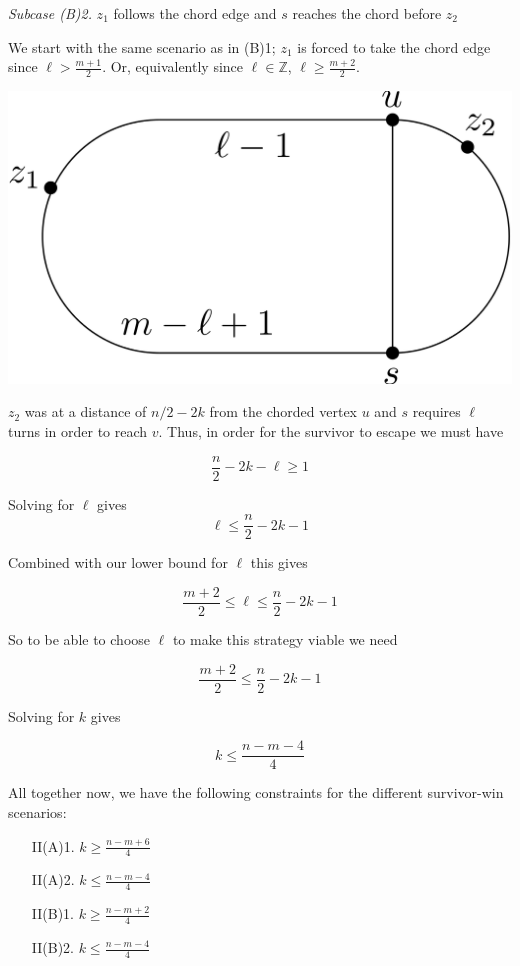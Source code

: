 \documentclass[letterpaper, 10pt]{article}
\newcommand{\Z}{\mathbb{Z}}
\begin{document}
\begin{enumerate}
       \emph{Subcase (B)2.} $z_1$ follows the chord edge and $s$ reaches the chord before $z_2$

       We start with the same scenario as in (B)1; $z_1$ is forced to take the chord edge since
       $\ell > \frac{m+1}{2}$. Or, equivalently since $\ell \in \Z$, $\ell \geq \frac{m+2}{2}$.

       \begin{center}
        \includegraphics[scale=0.15]{diagramCaseB2_2}
       \end{center}

       $z_2$ was at a distance of $n/2-2k$ from the chorded vertex $u$ and $s$ requires
       $\ell$ turns in order to reach $v$. Thus, in order for the survivor to escape
       we must have

       \[ \frac{n}{2} -2k - \ell \geq 1 \]

       Solving for $\ell$ gives
       \[ \ell \leq \frac{n}{2} -2k -1 \]

       Combined with our lower bound for $\ell$ this gives

       \[ \frac{m+2}{2} \leq \ell \leq \frac{n}{2} -2k -1 \]

       So to be able to choose $\ell$ to make this strategy viable we need

       \[ \frac{m+2}{2} \leq \frac{n}{2} -2k -1 \]

       Solving for $k$ gives

       \[ k \leq \frac{n-m-4}{4} \]

       All together now, we have the following constraints for the different survivor-win scenarios:

       \begin{itemize}
        \item[II(A)1.] $k \geq \frac{n-m+6}{4}$
        \item[II(A)2.] $k \leq \frac{n-m-4}{4}$
        \item[II(B)1.] $k \geq \frac{n-m+2}{4}$
        \item[II(B)2.] $k \leq \frac{n-m-4}{4}$


\end{itemize}
\end{enumerate}
\end{document}
